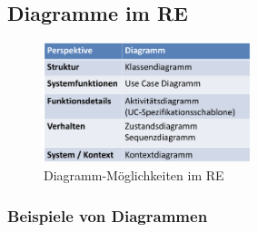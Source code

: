 \documentclass[a4paper]{article}
\begin{document}
		\subsection{Diagramme im RE}
	
			\begin{figure}[!htb]
				\centering
				\includegraphics[height=3.5cm]{img/re/03/re_diagramme.png}
				\caption{Diagramm-Möglichkeiten im RE}
				\label{fig:re_diagramme}
			\end{figure}
		
\newpage

			\subsubsection{Beispiele von Diagrammen}
			
\end{document}
